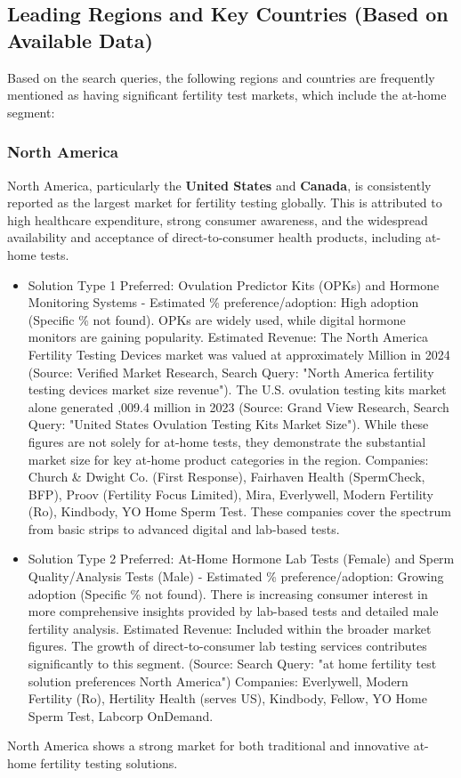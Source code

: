 \documentclass{article}
\begin{document}
\subsection{Leading Regions and Key Countries (Based on Available Data)}

Based on the search queries, the following regions and countries are frequently mentioned as having significant fertility test markets, which include the at-home segment:

\subsubsection{North America}
North America, particularly the \textbf{United States} and \textbf{Canada}, is consistently reported as the largest market for fertility testing globally. This is attributed to high healthcare expenditure, strong consumer awareness, and the widespread availability and acceptance of direct-to-consumer health products, including at-home tests.

\begin{itemize}
  \item Solution Type 1 Preferred: Ovulation Predictor Kits (OPKs) and Hormone Monitoring Systems - Estimated \% preference/adoption: High adoption (Specific \% not found). OPKs are widely used, while digital hormone monitors are gaining popularity.
    Estimated Revenue: The North America Fertility Testing Devices market was valued at approximately  Million in 2024 (Source: Verified Market Research, Search Query: "North America fertility testing devices market size revenue"). The U.S. ovulation testing kits market alone generated ,009.4 million in 2023 (Source: Grand View Research, Search Query: "United States Ovulation Testing Kits Market Size"). While these figures are not solely for at-home tests, they demonstrate the substantial market size for key at-home product categories in the region.
    Companies: Church \& Dwight Co. (First Response), Fairhaven Health (SpermCheck, BFP), Proov (Fertility Focus Limited), Mira, Everlywell, Modern Fertility (Ro), Kindbody, YO Home Sperm Test. These companies cover the spectrum from basic strips to advanced digital and lab-based tests.
  \item Solution Type 2 Preferred: At-Home Hormone Lab Tests (Female) and Sperm Quality/Analysis Tests (Male) - Estimated \% preference/adoption: Growing adoption (Specific \% not found). There is increasing consumer interest in more comprehensive insights provided by lab-based tests and detailed male fertility analysis.
    Estimated Revenue: Included within the broader market figures. The growth of direct-to-consumer lab testing services contributes significantly to this segment. (Source: Search Query: "at home fertility test solution preferences North America")
    Companies: Everlywell, Modern Fertility (Ro), Hertility Health (serves US), Kindbody, Fellow, YO Home Sperm Test, Labcorp OnDemand.
\end{itemize}
North America shows a strong market for both traditional and innovative at-home fertility testing solutions.
\end{document}

